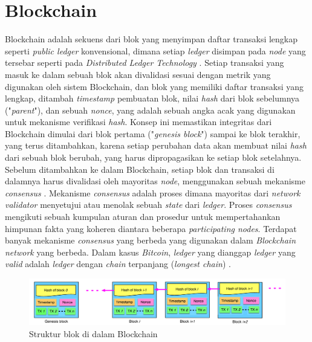 \section{Blockchain}
\label{sec:blockchain}

Blockchain adalah sekuens dari blok yang menyimpan daftar transaksi lengkap seperti \textit{public ledger} konvensional, dimana setiap \textit{ledger} disimpan pada \textit{node} yang tersebar seperti pada \textit{Distributed Ledger Technology} \parencite{zheng2018blockchain}. Setiap transaksi yang masuk ke dalam sebuah blok akan divalidasi sesuai dengan metrik yang digunakan oleh sistem Blockchain, dan blok yang memiliki daftar transaksi yang lengkap, ditambah \textit{timestamp} pembuatan blok, nilai \textit{hash} dari blok sebelumnya ("\textit{parent}"), dan sebuah \textit{nonce}, yang adalah sebuah angka acak yang digunakan untuk mekanisme verifikasi \textit{hash}. Konsep ini memastikan integritas dari Blockchain dimulai dari blok pertama ("\textit{genesis block}") sampai ke blok terakhir, yang terus ditambahkan, karena setiap perubahan data akan membuat nilai \textit{hash} dari sebuah blok berubah, yang harus dipropagasikan ke setiap blok setelahnya. Sebelum ditambahkan ke dalam Blockchain, setiap blok dan transaksi di dalamnya harus divalidasi oleh mayoritas \textit{node}, menggunakan sebuah mekanisme \textit{consensus} \parencite{nofer2017blockchain}. Mekanisme \textit{consensus} adalah proses dimana mayoritas dari \textit{network validator} menyetujui atau menolak sebuah \textit{state} dari \textit{ledger}. Proses \textit{consensus} mengikuti sebuah kumpulan aturan dan prosedur untuk mempertahankan himpunan fakta yang koheren diantara beberapa \textit{participating nodes}. Terdapat banyak mekanisme \textit{consensus} yang berbeda yang digunakan dalam \textit{Blockchain network} yang berbeda. Dalam kasus \textit{Bitcoin}, \textit{ledger} yang dianggap \textit{ledger} yang \textit{valid} adalah \textit{ledger} dengan \textit{chain} terpanjang (\textit{longest chain}) \parencite{swanson2015consensus}.

\begin{figure}[ht]
	\centering
	\includegraphics[width=1\textwidth]{resources/chapter-2/struktur-blockchain.png}
	\caption{Struktur blok di dalam Blockchain \parencite{zheng2018blockchain}}
	\label{image:struktur-blockchain}
\end{figure}

